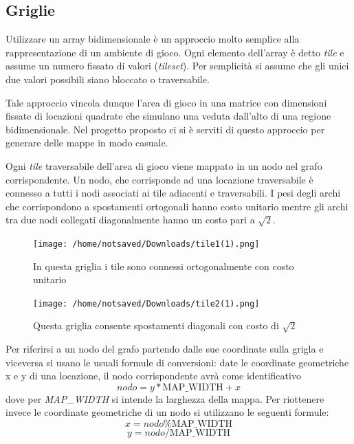 \documentclass[12pt]{book}
\begin{document}
\subsection{Griglie}\label{subs:griglie}
\par{Utilizzare un array bidimensionale \`e un approccio molto semplice alla rappresentazione di un ambiente di gioco. Ogni elemento dell'array \`e detto \emph{tile} e assume un numero fissato di valori (\emph{tileset}). Per semplicit\`a si assume che gli unici due valori possibili siano bloccato o traversabile.}
\par{Tale approccio vincola dunque l'area di gioco in una matrice con dimensioni fissate di locazioni quadrate che simulano una veduta dall'alto di una regione bidimensionale. 
 Nel progetto proposto ci si \`e serviti di questo approccio per generare delle mappe in modo casuale.}
 \par{Ogni \emph{tile} traversabile dell'area di gioco viene mappato in un nodo nel grafo corrispondente. Un nodo, che corrisponde ad una locazione traversabile \`e connesso a tutti i nodi associati ai tile adiacenti e traversabili. I pesi degli archi che corrispondono a spostamenti ortogonali hanno costo unitario mentre gli archi tra due nodi collegati diagonalmente hanno un costo pari a $\sqrt{2}$.} 
 \begin{figure}[htp]

  \texttt{[image: /home/notsaved/Downloads/tile1(1).png]}
  \caption{In questa griglia i tile sono connessi ortogonalmente con costo unitario}\label{fig:tile}
\endminipage\hfill
{}%
  \texttt{[image: /home/notsaved/Downloads/tile2(1).png]}
  \caption{Questa griglia consente spostamenti diagonali con costo di $\sqrt2$}\label{fig:octile}
\endminipage
\end{figure}
 \par{Per riferirsi a un nodo del grafo partendo dalle sue coordinate sulla grigla e viceversa si usano le usuali formule di conversioni:
date le coordinate geometriche x e y di una locazione, il nodo corrispondente avr\`a come identificativo \begin{equation} nodo = y*\mbox{MAP\_WIDTH} + x \end{equation} dove per \emph{MAP\_WIDTH} si intende la larghezza della mappa. Per riottenere invece le coordinate geometriche di un nodo si utilizzano le seguenti formule: \begin{equation} x = nodo \% \mbox{MAP\_WIDTH} \end{equation} \begin{equation} y = nodo / \mbox{MAP\_WIDTH} \end{equation} 
}
\iffalse
\end{document}
